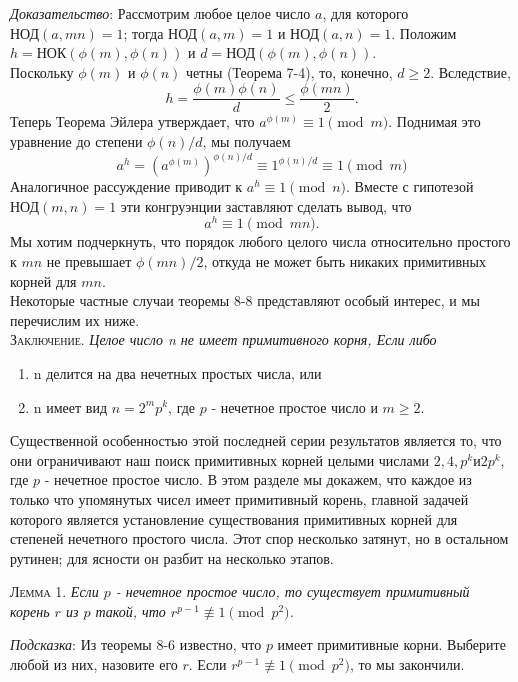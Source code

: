 \documentclass[11pt]{article}
\begin{document}
\newpage
{}

\emph{Доказательство}: Рассмотрим любое целое число $a$, для которого $\text{НОД}(a,mn)=1$; тогда $\text{НОД}(a,m)=1$ и $\text{НОД}(a,n)=1$. Положим $h=\text{НОК}(\phi(m),\phi(n))$ и $d=\text{НОД}(\phi(m),\phi(n)).$ \\
Поскольку $\phi(m)$ и $\phi (n)$ четны (Теорема 7-4), то, конечно, $d \geq 2$. Вследствие,
\begin{equation*}
    h = \frac{\phi(m)\phi(n)}{d} \leq \frac{\phi(mn)}{2}.
\end{equation*}
Теперь Теорема Эйлера утверждает, что $a^{\phi(m)} \equiv 1 \pmod{m}$. Поднимая это уравнение до степени $\phi (n)/d$, мы получаем
\begin{equation*}
    a^h = (a^{\phi(m)})^{\phi(n)/d} \equiv 1^{\phi(n)/d} \equiv 1 \pmod{m}
\end{equation*}
Аналогичное рассуждение приводит к $a^h \equiv 1 \pmod{n}$. Вместе с гипотезой $\text{НОД} (m,n)=1$ эти конгруэнции заставляют сделать вывод, что
\begin{equation*}
    a^h \equiv 1 \pmod{mn}.
\end{equation*}
Мы хотим подчеркнуть, что порядок любого целого числа относительно простого к $mn$ не превышает $\phi (mn)/2$, откуда не может быть никаких примитивных корней для $mn$. \\
Некоторые частные случаи теоремы 8-8 представляют особый интерес, и мы перечислим их ниже. \\
\textsc{Заключение.} \quad \textsl{Целое число n не имеет примитивного корня, Если либо}
\begin{enumerate}
\item n делится на два нечетных простых числа, или
\item n имеет вид $n = 2^{m}p^{k}$, где $p$ - нечетное простое число и $m \geq 2$.
\end{enumerate}
\qquad Существенной особенностью этой последней серии результатов является то, что они ограничивают наш поиск примитивных корней целыми числами $2, 4, p^k и 2p^k$, где $p$ - нечетное простое число. В этом разделе мы докажем, что каждое из только что упомянутых чисел имеет примитивный корень, главной задачей которого является установление существования примитивных корней для степеней нечетного простого числа. Этот спор несколько затянут, но в остальном рутинен; для ясности он разбит на несколько этапов. \\
\begin{center}
\textsc{Лемма 1.} \quad \textsl{Если $p$ - нечетное простое число, то существует примитивный корень $r$ из $p$ такой, что $r^{p-1} \not\equiv 1 \pmod{p^2}$.}
\end{center}
\emph{Подсказка}: Из теоремы 8-6 известно, что $p$ имеет примитивные корни. Выберите любой из них, назовите его $r$. Если $r^{p-1} \not\equiv 1 \pmod{p^2}$, то мы закончили.
\end{document}
